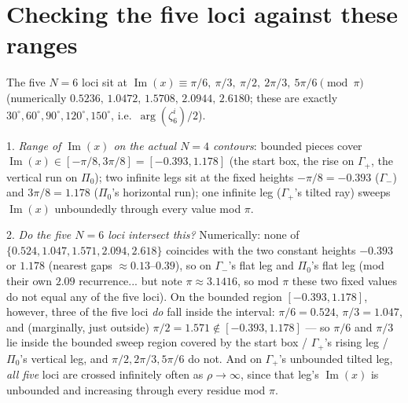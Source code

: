 \documentclass[11pt]{article}
\begin{document}
\section*{Checking the five loci against these ranges}

The five $N=6$ loci sit at $\operatorname{Im}(x)\equiv\pi/6,\ \pi/3,\ \pi/2,\ 2\pi/3,\ 5\pi/6
\pmod\pi$ (numerically $0.5236,\,1.0472,\,1.5708,\,2.0944,\,2.6180$; these are exactly $30^\circ,
60^\circ,90^\circ,120^\circ,150^\circ$, i.e.\ $\arg(\zeta_6^i)/2$).

1. \emph{Range of $\operatorname{Im}(x)$ on the actual $N=4$ contours}: bounded pieces cover
$\operatorname{Im}(x)\in[-\pi/8,3\pi/8]=[-0.393,1.178]$ (the start box, the rise on $\Gamma_+$,
the vertical run on $\Pi_0$); two infinite legs sit at the fixed heights $-\pi/8=-0.393$
($\Gamma_-$) and $3\pi/8=1.178$ ($\Pi_0$'s horizontal run); one infinite leg ($\Gamma_+$'s tilted
ray) sweeps $\operatorname{Im}(x)$ unboundedly through every value mod $\pi$.

2. \emph{Do the five $N=6$ loci intersect this?} Numerically: none of $\{0.524,1.047,1.571,
2.094,2.618\}$ coincides with the two constant heights $-0.393$ or $1.178$ (nearest gaps
$\approx0.13$--$0.39$), so on $\Gamma_-$'s flat leg and $\Pi_0$'s flat leg (mod their own $2.09$
recurrence... but note $\pi\approx3.1416$, so mod $\pi$ these two fixed values do not equal any
of the five loci). On the bounded region $[-0.393,1.178]$, however, three of the five loci
\emph{do} fall inside the interval: $\pi/6=0.524$, $\pi/3=1.047$, and (marginally, just outside)
$\pi/2=1.571\notin[-0.393,1.178]$ --- so $\pi/6$ and $\pi/3$ lie inside the bounded sweep region
covered by the start box / $\Gamma_+$'s rising leg / $\Pi_0$'s vertical leg, and $\pi/2,2\pi/3,
5\pi/6$ do not. And on $\Gamma_+$'s unbounded tilted leg, \emph{all five} loci are crossed
infinitely often as $\rho\to\infty$, since that leg's $\operatorname{Im}(x)$ is unbounded and
increasing through every residue mod $\pi$.
\end{document}
